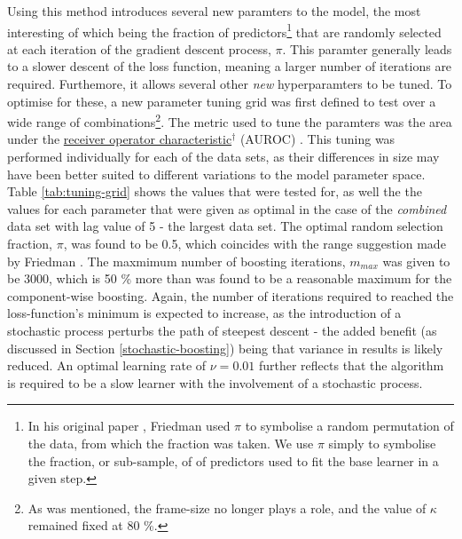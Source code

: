 \documentclass{article}
\begin{document}
Using this method introduces several new paramters to the model, the most interesting of which being the fraction of predictors\footnote{In his original paper \cite{friedman2002stochastic}, Friedman used $\pi$ to symbolise a random permutation of the data, from which the fraction was taken. We use $\pi$ simply to symbolise the fraction, or sub-sample, of of predictors used to fit the base learner in a given step.} that are randomly selected at each iteration of the gradient descent process, $\pi$. This paramter generally leads to a slower descent of the loss function, meaning a larger number of iterations are required. Furthemore, it allows several other \emph{new} hyperparamters to be tuned. To optimise for these, a new parameter tuning grid was first defined to test over a wide range of combinations\footnote{As was mentioned, the frame-size no longer plays a role, and the value of $\kappa$ remained fixed at 80 \%.}. The metric used to tune the paramters was the area under the \href{https://en.wikipedia.org/wiki/Receiver_operating_characteristic}{receiver operator characteristic$^{\dag{}}$} (AUROC) \cite{bradley1997use}. This tuning was performed individually for each of the data sets, as their differences in size may have been better suited to different variations to the model parameter space. Table \ref{tab:tuning-grid} shows the values that were tested for, as well the the values for each parameter that were given as optimal in the case of the \emph{combined} data set with lag value of 5 - the largest data set. The optimal random selection fraction, $\pi$, was found to be 0.5, which coincides with the range suggestion made by Friedman \cite{friedmanstochastic}. The maxmimum number of boosting iterations, $m_{max}$ was given to be 3000, which is 50 \% more than was found to be a reasonable maximum for the component-wise boosting. Again, the number of iterations required to reached the loss-function's minimum is expected to increase, as the introduction of a stochastic process perturbs the path of steepest descent - the added benefit (as discussed in Section \ref{stochastic-boosting}) being that variance in results is likely reduced. An optimal learning rate of $\nu = 0.01$ further reflects that the algorithm is required to be a slow learner with the involvement of a stochastic process.

\vspace{5mm}
\end{document}
